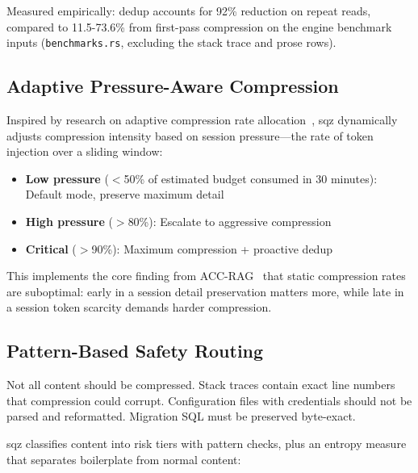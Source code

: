 \documentclass[10pt,twocolumn]{article}
\begin{document}
Measured empirically: dedup accounts for 92\% reduction on repeat reads, compared to 11.5-73.6\% from first-pass compression on the engine benchmark inputs (\texttt{benchmarks.rs}, excluding the stack trace and prose rows).

\subsection{Adaptive Pressure-Aware Compression}

Inspired by research on adaptive compression rate allocation~\cite{adaptive2025,accrag2025}, sqz dynamically adjusts compression intensity based on session pressure---the rate of token injection over a sliding window:

\begin{itemize}
  \item \textbf{Low pressure} ($<$50\% of estimated budget consumed in 30 minutes): Default mode, preserve maximum detail
  \item \textbf{High pressure} ($>$80\%): Escalate to aggressive compression
  \item \textbf{Critical} ($>$90\%): Maximum compression + proactive dedup
\end{itemize}

This implements the core finding from ACC-RAG~\cite{accrag2025} that static compression rates are suboptimal: early in a session detail preservation matters more, while late in a session token scarcity demands harder compression.

\subsection{Pattern-Based Safety Routing}

Not all content should be compressed. Stack traces contain exact line numbers that compression could corrupt. Configuration files with credentials should not be parsed and reformatted. Migration SQL must be preserved byte-exact.

sqz classifies content into risk tiers with pattern checks, plus an entropy measure that separates boilerplate from normal content:
\end{document}
